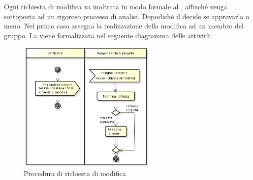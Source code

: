 			\label{sec:StrutturaIssue}
				Ogni richiesta di modifica va inoltrata in modo formale al , affinché venga sottoposta ad un rigoroso processo di analisi. Dopodiché il  decide se approvarla o meno. Nel primo caso assegna la realizzazione della modifica ad un membro del gruppo. 
				La  viene formalizzata nel seguente diagramma delle attività:
				\begin{figure}[H]
					\centering
					\includegraphics[width=0.6\textwidth]{NormeDiProgetto/Pics/RichiestaDiModifica}
					\caption{Procedura di richiesta di modifica}
				\end{figure}
			

